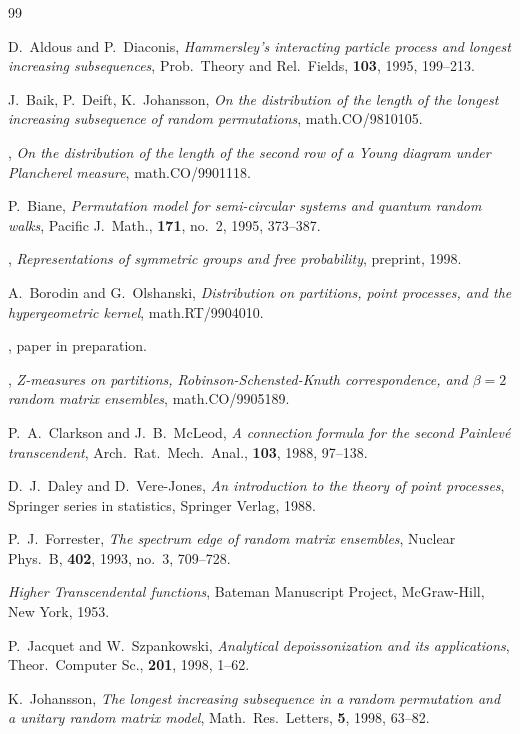 \documentclass[12pt]{amsart}
\theoremstyle{plain}
\theoremstyle{definition}
\numberwithin{equation}{section}
\begin{document}
\begin{thebibliography}{99}


D.~Aldous and P.~Diaconis,
\emph{Hammersley's interacting particle process and longest
increasing subsequences},
Prob.\ Theory and Rel.\ Fields, \textbf{103}, 1995, 199--213.

J.~Baik, P.~Deift, K.~Johansson,
\emph{On the distribution of the length of the longest
increasing subsequence of random permutations},
math.CO/9810105.

\bysame,
\emph{On the distribution of the length of the second row
of a Young diagram under Plancherel measure},
math.CO/9901118.

P.~Biane,
\emph{Permutation model for semi-circular systems and quantum
random walks},
Pacific J.~Math., \textbf{171}, no.~2, 1995, 373--387. 

\bysame,
\emph{Representations of symmetric groups and free probability},
preprint, 1998.

A.~Borodin and G.~Olshanski,
\emph{Distribution on partitions, point processes,
and the hypergeometric kernel},
math.RT/9904010. 

\bysame, paper in preparation. 

\bysame,
\emph{Z-measures on partitions, Robinson-Schensted-Knuth
correspondence, and $\beta=2$ random matrix ensembles},
math.CO/9905189.

P.~A.~Clarkson and J.~B.~McLeod,
\emph{A connection formula for the second Painlev\'e
transcendent},
Arch.\ Rat.\ Mech.\ Anal., \textbf{103}, 1988, 97--138. 

D.~J.~Daley and D.~Vere-Jones,
\emph{An introduction to the theory of point processes},
Springer series in statistics, Springer Verlag, 1988. 

P.~J.~Forrester,
\emph{The spectrum edge of random matrix ensembles},
Nuclear Phys.~B, \textbf{402}, 1993, no.~3, 709--728.


\emph{Higher Transcendental functions}, Bateman 
Manuscript Project, McGraw-Hill, New York, 1953. 

P.~Jacquet and W.~Szpankowski,
\emph{Analytical depoissonization and its applications},
Theor.\ Computer Sc., \textbf{201}, 1998, 1--62.

K.~Johansson,
\emph{The longest increasing subsequence in a random
permutation and a unitary random matrix model},
Math.\ Res.\ Letters, \textbf{5}, 1998, 63--82. 


\end{thebibliography}
\end{document}

